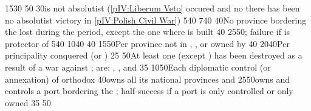 {15}{30}{\EU@objNoRUSBaltique}%
%
%
{}{50}{\EU@objDMB}%
%
%
{}{30}{\paysmajeurPologne is not absolutist (\ref{pIV:Liberum Veto} occured
  and no there has been no absolutist victory in \ref{pIV:Polish Civil War})}%
% 
%
%
{5}{40}{\EU@objBaltiqueTrade}%
%
%
{7}{40}{\EU@objEachCOLTP}%
%
%
{}{40}{No province bordering the \regionBaltique lost during the period,
  except the one where  is built}%
%
%
{}{40}{\EU@objDMB}%
%
%
{25}{50}{\EU@objPOLVictory; failure if \paysmajeurFrance is protector of
  \paysPologne}%
%
%
%
{5}{40}{\EU@objBaltiqueTrade}%
%
%
{10}{40}{\EU@objEachCOLTP}%
%
%
{}{40}{}%
%
%
{15}{50}{Per province not in \regionNorvege, \regionDanemark, \regionFinlande
  or \regionSuede owned by \paysmajeurSuede}%
%
%
{}{40}{}%
%
 
%
%
{20}{40}{Per principality conquered (\payspskov or \paysryazan)}%
%
%
%
%
{}{25}{}%
%
%
{}{50}{At least one  (except \paysSteppes) has been destroyed
  as a result of a war against \paysmajeurRussie;  are:
  \paysKazan, \paysAstrakhan, \paysCrimee and \paysCosaquesdon}%
%
%
{}{35}{}%
%
%
%
{10}{50}{Each diplomatic control (or annexation) of orthodox \MIN}%
%
%
{}{40}{\paysmajeurRussie owns all its national provinces and
  \provinceSmolenska}%
%
%
{25}{50}{\paysmajeurRussie owns and controls a port bordering the
  \regionBaltique; half-success if a port is only controlled or only owned}%
%
%
{}{35}{}%
%
%
{}{50}{}%
